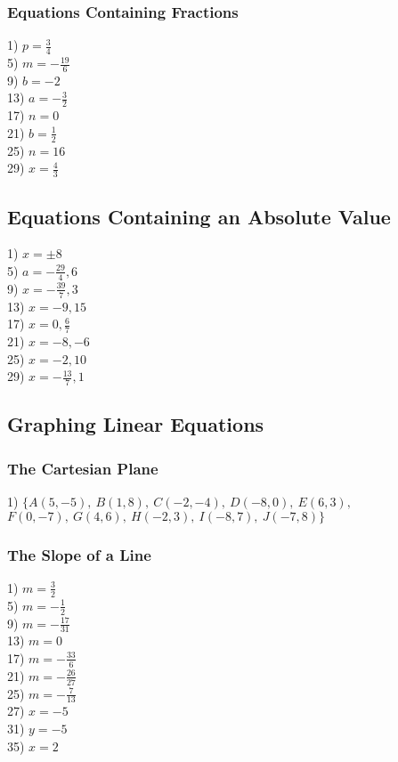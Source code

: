 \documentclass[12pt]{book}
\theoremstyle{definition}
\begin{document}
\subsubsection*{Equations Containing Fractions}
\begin{multicols}{4}
1) $p=\frac{3}{4}$\\
5) $m=-\frac{19}{6}$\\
9) $b=-2$\\
13) $a=-\frac{3}{2}$\\
17) $n=0$\\
21) $b=\frac{1}{2}$\\
25) $n=16$\\
29) $x=\frac{4}{3}$
\end{multicols}
\subsection*{Equations Containing an Absolute Value}
\begin{multicols}{4}
1) $x=\pm 8$\\
5) $a=-\frac{29}{4}, 6$\\
9) $x=-\frac{39}{7}, 3$\\
13) $x=-9, 15$\\
17) $x=0, \frac{6}{7}$\\
21) $x=-8, -6$\\
25) $x=-2, 10$\\
29) $x=-\frac{13}{7}, 1$
\end{multicols}
\subsection*{Graphing Linear Equations}
\subsubsection*{The Cartesian Plane}
1) $\{A(5,-5), \ B(1,8), \ C(-2,-4), \ D(-8,0), \ E(6,3),$\\
$F(0,-7), \ G(4,6), \ H(-2,3), \ I(-8,7), \ J(-7,8)\}$ 

\subsubsection*{The Slope of a Line}
\begin{multicols}{5}
1) $m=\frac{3}{2}$\\
5) $m=-\frac{1}{2}$\\
9) $m=-\frac{17}{31}$\\
13) $m=0$\\
17) $m=-\frac{33}{6}$\\
21) $m=-\frac{26}{27}$\\
25) $m=-\frac{7}{13}$\\
27) $x=-5$\\
31) $y=-5$\\
35) $x=2$
\end{multicols}
\end{document}
